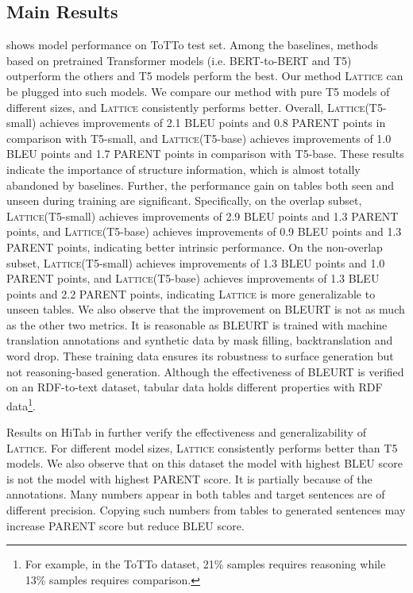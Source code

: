 \documentclass[11pt]{article}
\newcommand{\model}{\mbox{\textsc{Lattice}}\xspace}
\begin{document}
\subsection{Main Results}
\label{sec/exp/main}
 shows model performance on ToTTo test set. 
Among the baselines, methods based on pretrained Transformer models (i.e. BERT-to-BERT and T5) outperform the others and T5 models perform the best.
Our method \model can be plugged into such models.
We compare our method with pure T5 models of different sizes, and \model consistently performs better.
Overall, \model (T5-small) achieves improvements of 2.1 BLEU points and 0.8 PARENT points in comparison with T5-small, and \model (T5-base) achieves improvements of 1.0 BLEU points and 1.7 PARENT points in comparison with T5-base.
These results indicate the importance of structure information, which is almost totally abandoned by baselines.
Further, the performance gain on tables both seen and unseen during training are significant.
Specifically, on the overlap subset, \model (T5-small) achieves improvements of 2.9 BLEU points and 1.3 PARENT points, and \model (T5-base) achieves improvements of 0.9 BLEU points and 1.3 PARENT points, indicating better intrinsic performance. 
On the non-overlap subset, \model (T5-small) achieves improvements of 1.3 BLEU points and 1.0 PARENT points, and \model (T5-base) achieves improvements of 1.3 BLEU points and 2.2 PARENT points, indicating \model is more generalizable to unseen tables.
We also observe that the improvement on BLEURT is not as much as the other two metrics.
It is reasonable as BLEURT is trained with machine translation annotations and synthetic data by mask filling, backtranslation and word drop.
These training data ensures its robustness to surface generation but not reasoning-based generation.
Although the effectiveness of BLEURT is verified on an RDF-to-text dataset, tabular data holds different properties with RDF data\footnote{For example, in the ToTTo dataset, 21\% samples requires reasoning while 13\% samples requires comparison.}.

Results on HiTab in  further verify the effectiveness and generalizability of \model.
For different model sizes, \model consistently performs better than T5 models.
We also observe that on this dataset the model with highest BLEU score is not the model with highest PARENT score.
It is partially because of the annotations. 
Many numbers appear in both tables and target sentences are of different precision.
Copying such numbers from tables to generated sentences may increase PARENT score but reduce BLEU score.
\end{document}
